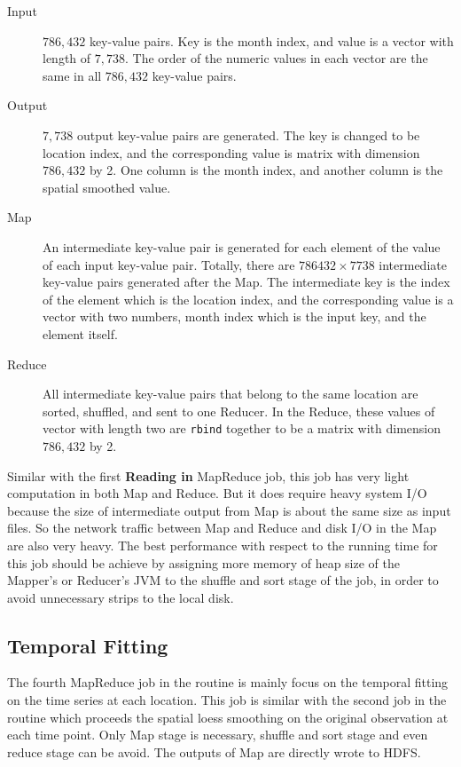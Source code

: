 \begin{description}
\item[Input] $786,432$ key-value pairs. Key is the month index, and value is a 
vector with length of $7,738$. The order of the numeric values in each vector are 
the same in all $786,432$ key-value pairs.
\item[Output] $7,738$ output key-value pairs are generated. The key is changed
to be location index, and the corresponding value is matrix with dimension 
$786,432$ by 2. One column is the month index, and another column is the spatial
smoothed value.
\item[Map]An intermediate key-value pair is generated for each element of the
value of each input key-value pair. Totally, there are $786432 \times 7738$ 
intermediate key-value pairs generated after the Map. The intermediate key is the 
index of the element which is the location index, and the corresponding value is 
a vector with two numbers, month index which is the input key, and the element 
itself.   
\item[Reduce] All intermediate key-value pairs that belong to the same location
are sorted, shuffled, and sent to one Reducer. In the Reduce, these values of
vector with length two are \texttt{rbind} together to be a matrix with dimension
$786,432$ by 2.
\end{description}

Similar with the first \textbf{Reading in} MapReduce job, this job has very light
computation in both Map and Reduce. But it does require heavy system I/O because
the size of intermediate output from Map is about the same size as input files.
So the network traffic between Map and Reduce and disk I/O in the Map are also 
very heavy. The best performance with respect to the running time for this job
should be achieve by assigning more memory of heap size of the Mapper's or 
Reducer's JVM to the shuffle and sort stage of the job, in order to avoid 
unnecessary strips to the local disk.

\subsection{Temporal Fitting}
\label{sec:stlfit}
The fourth MapReduce job in the routine is mainly focus on the temporal fitting
on the time series at each location. This job is similar with the second job in
the routine which proceeds the spatial loess smoothing on the original observation
at each time point. Only Map stage is necessary, shuffle and sort stage and even
reduce stage can be avoid. The outputs of Map are directly wrote to HDFS.


